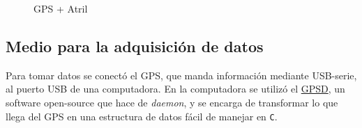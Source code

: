 \documentclass[spanish,12pt,a4paper,titlepage]{report}
\begin{document}
\begin{figure} [h!]
  \centering
  \caption{GPS + Atril}
  \label{fig:rebotes}
\end{figure}

\subsection{Medio para la adquisición de datos}
\label{sec:adquisicion-de-datos}

Para tomar datos se conectó el GPS, que manda información mediante USB-serie, al puerto USB de una computadora. En la computadora se utilizó el \href{http://catb.org/gpsd/}{GPSD}, un software open-source que hace de \textit{daemon}, y se encarga de transformar lo que llega del GPS en una estructura de datos fácil de manejar en \verb+C+.
\end{document}
